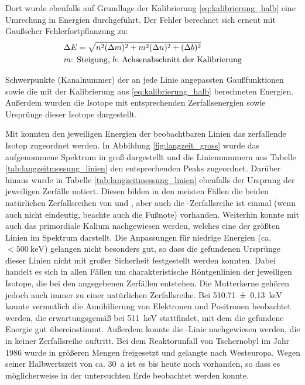 \documentclass[11pt, a4paper]{article}
\numberwithin{equation}{section}
\newcommand{\cs}{\isotope[137]{Cs}}
\begin{document}
Dort wurde ebenfalls auf Grundlage der Kalibrierung \eqref{eq:kalibrierung_halb} eine Umrechung in Energien durchgeführt.
Der Fehler berechnet sich erneut mit Gaußscher Fehlerfortpflanzung zu:
\begin{align}
&\Delta E = \sqrt{n^2 (\Delta m)^2 + m^2 (\Delta n)^2 + (\Delta b)^2} \\
&\text{$m$: Steigung, $b$: Achsenabschnitt der Kalibrierung} \notag
\end{align}
\begin{table}
	\centering
	
	\caption{Schwerpunkte (Kanalnummer) der an jede Linie angepassten Gaußfunktionen sowie die mit der Kalibrierung aus \eqref{eq:kalibrierung_halb} berechneten Energien. Außerdem wurden die Isotope mit entsprechenden Zerfallsenergien sowie Ursprünge dieser Isotope dargestellt.}
	\label{tab:langzeitmessung_linien}
\end{table}
Mit \cite{gilmore} konnten den jeweiligen Energien der beobachtbaren Linien das zerfallende Isotop zugeordnet werden.
In Abbildung \ref{fig:langzeit_gross} wurde das aufgenommene Spektrum in groß dargestellt und die Liniennummern aus Tabelle \ref{tab:langzeitmessung_linien} den entsprechenden Peaks zugeordnet.
Darüber hinaus wurde in Tabelle \ref{tab:langzeitmessung_linien} ebenfalls der Ursprung der jeweiligen Zerfälle notiert.
Diesen bilden in den meisten Fällen die beiden natürlichen Zerfallsreihen von  und , aber auch die -Zerfallsreihe ist einmal (wenn auch nicht eindeutig, beachte auch die Fußnote) vorhanden.
Weiterhin konnte mit  auch das primordiale Kalium nachgewiesen werden, welches eine der größten Linien im Spektrum darstellt.
Die Anpassungen für niedrige Energien (ca. $<\SI{500}{\kilo\electronvolt}$) gelangen nicht besonders gut, so dass die gefundenen Ursprünge dieser Linien nicht mit großer Sicherheit festgestellt werden konnten.
Dabei handelt es sich in allen Fällen um charakteristische Röntgenlinien der jeweiligen Isotope, die bei den angegebenen Zerfällen entstehen.
Die Mutterkerne gehören jedoch auch immer zu einer natürlichen Zerfallsreihe.
Bei \SI{510.71+-0.13}{\kilo\electronvolt} konnte vermutlich die Annihilierung von Elektronen und Positronen beobachtet werden, die erwartungsgemäß bei \SI{511}{\kilo\electronvolt} stattfindet, mit dem die gefundene Energie gut übereinstimmt.
Außerdem konnte die \cs{}-Linie nachgewiesen werden, die in keiner Zerfallsreihe auftritt.
Bei dem Reaktorunfall von Tschernobyl im Jahr 1986 wurde \cs{} in größeren Mengen freigesetzt und gelangte nach Westeuropa.
Wegen seiner Halbwertszeit von ca. \SI{30}{a} ist es bis heute noch vorhanden, so dass es möglicherweise in der untersuchten Erde beobachtet werden konnte. 
\FloatBarrier
\end{document}
